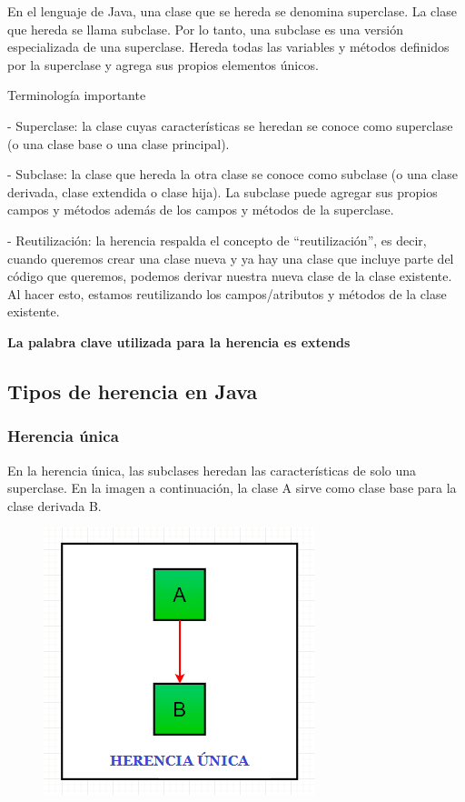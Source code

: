 \documentclass[12pt,a4paper]{report}
\begin{document}
{En el lenguaje de Java, una clase que se hereda se denomina superclase. La clase que hereda se llama subclase. Por lo tanto, una subclase es una versión especializada de una superclase. Hereda todas las variables y métodos definidos por la superclase y agrega sus propios elementos únicos.

Terminología importante

- Superclase: la clase cuyas características se heredan se conoce como superclase (o una clase base o una clase principal).

- Subclase: la clase que hereda la otra clase se conoce como subclase (o una clase derivada, clase extendida o clase hija). La subclase puede agregar sus propios campos y métodos además de los campos y métodos de la superclase.

- Reutilización: la herencia respalda el concepto de “reutilización”, es decir, cuando queremos crear una clase nueva y ya hay una clase que incluye parte del código que queremos, podemos derivar nuestra nueva clase de la clase existente. Al hacer esto, estamos reutilizando los campos/atributos y métodos de la clase existente.

\textbf{La palabra clave utilizada para la herencia es extends}
\subsection*{Tipos de herencia en Java}
\subsubsection*{Herencia única}
En la herencia única, las subclases heredan las características de solo una superclase. En la imagen a continuación, la clase A sirve como clase base para la clase derivada B.
\begin{figure}[hbtp]
\centering
\includegraphics[scale=0.8]{herenciaunica.png}
\end{figure}

}
\end{document}
